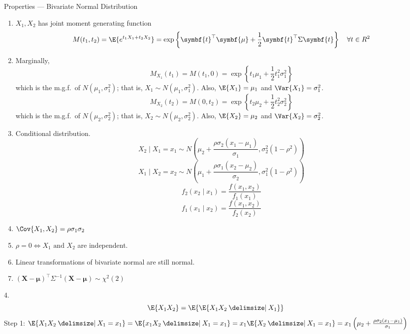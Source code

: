 \begin{Proposition}{Properties --- Bivariate Normal Distribution}{}
    \begin{enumerate}[label=(\arabic*)]
        \item $ X_1,X_2 $ has joint moment generating function
              \[ M(t_1,t_2)=\E{
                      e^{t_1X_1+t_2X_2}
                  }=\exp\left\{ \symbf{t}^\top \symbf{\mu}+\frac{1}{2}\symbf{t}^\top \Sigma
                  \symbf{t} \right\}\quad \forall t\in\mathbb{R}^2 \]
        \item Marginally,
              \[ M_{X_1}(t_1)=M(t_1,0)=\exp\left\{ t_1\mu_1+\frac{1}{2} t_1^2
                  \sigma_1^2\right\} \]
              which is the m.g.f.\ of $ N(\mu_1,\sigma_1^2) $; that is,
              $ X_1 \sim N(\mu_1,\sigma_1^2) $. Also,
              $ \E{X_1}=\mu_1 $ and $ \Var{X_1}=\sigma_1^2 $.
              \[ M_{X_2}(t_2)=M(0,t_2)=\exp\left\{ t_2\mu_2+\frac{1}{2} t_2^2
                  \sigma_2^2\right\} \]
              which is the m.g.f.\ of $ N(\mu_2,\sigma_2^2) $; that is,
              $ X_2 \sim N(\mu_2,\sigma_2^2) $. Also,
              $ \E{X_2}=\mu_2 $ and $ \Var{X_2}=\sigma_2^2 $.
        \item Conditional distribution.
              \[ X_2\mid X_1=x_1 \sim N
                  \left( \mu_2+\frac{\rho\sigma_2(x_1-\mu_1)}{\sigma_1} ,
                  \sigma_2^2(1-\rho^2) \right) \]
              \[ X_1\mid X_2=x_2 \sim N
                  \left( \mu_1+\frac{\rho\sigma_1(x_2-\mu_2)}{\sigma_2} ,
                  \sigma_1^2(1-\rho^2) \right) \]
              \[ f_2(x_2\mid x_1)=\frac{f(x_1,x_2)}{f_1(x_1)}  \]
              \[ f_1(x_1\mid x_2)=\frac{f(x_1,x_2)}{f_2(x_2)}  \]
        \item $ \Cov{X_1,X_2}=\rho\sigma_1\sigma_2 $
        \item $ \rho=0\iff X_1\text{ and }X_2 $ are independent.
        \item Linear transformations of bivariate
              normal are still normal.
        \item $ (\symbf{X}-\symbf{\mu})^\top \Sigma^{-1}(\symbf{X}-\symbf{\mu})\sim \chi^2(2) $
    \end{enumerate}
\end{Proposition}

4. \[ \E{X_1X_2}=\E{\E{X_1X_2\given X_1}} \]
Step 1: $ \E{X_1X_2\given X_1=x_1}=\E{x_1X_2\given X_1=x_1}=
    x_1\E{X_2\given X_1=x_1}=x_1
    \left(  \mu_2+\frac{\rho\sigma_2(x_1-\mu_1)}{\sigma_1} \right) $

